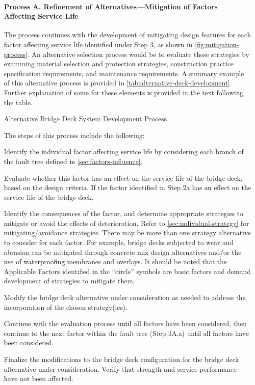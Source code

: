 \paragraph*{Process A. Refinement of Alternatives—Mitigation of Factors Affecting Service Life}
The process continues with the development of mitigating design features for each factor affecting service life identified under Step 3, as shown in \cref{fig:mitigation-process}. An alternative selection process would be to evaluate these strategies by examining material selection and protection strategies, construction practice specification requirements, and maintenance requirements. A summary example of this alternative process is provided in \cref{tab:alternative-deck-development}. Further explanation of some for these elements is provided in the text following the table.

\begin{table}
  \caption{Alternative Bridge Deck System Development Process.}
  \label{tab:alternative-deck-development}
\end{table}

The steps of this process include the following:
\begin{description}[style=nextline,leftmargin=8em]
  \item[Step 1A.] Identify the individual factor affecting service life by considering each branch of the fault tree defined in \cref{sec:factors-influence}.
  \item[Step 2A.]Evaluate whether this factor has an effect on the service life of the bridge deck, based on the design
  criteria. If the factor identified in Step 2a has an effect on the service life of the bridge deck,
  \item[Step 2A.a.] Identify the consequences of the factor, and determine appropriate strategies to mitigate or avoid the effects of deterioration. Refer to \cref{sec:individual-strategy} for mitigating/avoidance strategies. There may be more   than one strategy alternative to consider for each factor. For example, bridge decks subjected to wear and abrasion can be mitigated through concrete mix design alternatives and/or the use of waterproofing membranes and overlays. It should be noted that the Applicable Factors identified in
  the “circle” symbols are basic factors and demand development of strategies to mitigate them.
  \item[Step 2A.b.] Modify the bridge deck alternative under consideration as needed to address the incorporation of the chosen strategy(ies).
  \item[Step 3A:]Continue with the evaluation process until all factors have been considered, then continue to the next factor within the fault tree (Step 3A.a) until all factors have been considered.
  \item[Step 4A:] Finalize the modifications to the bridge deck configuration for the bridge deck alternative under consideration. Verify that strength and service performance have not been affected.
\end{description}

